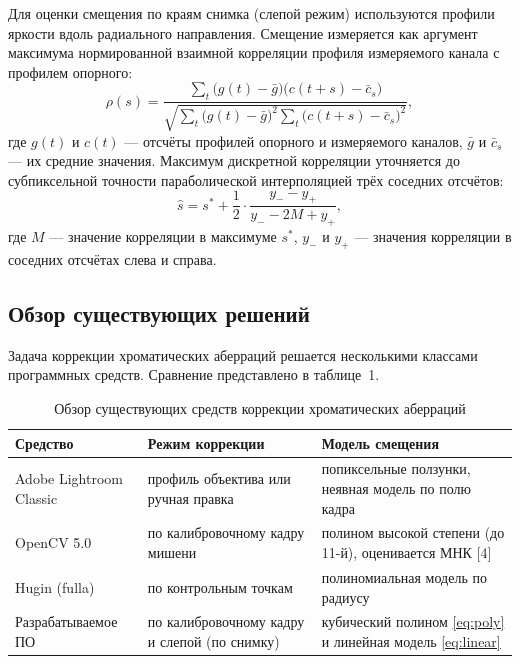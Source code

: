 \documentclass[a4paper,14pt,oneside]{extreport}
\begin{document}
Для оценки смещения по краям снимка (слепой режим) используются профили
яркости вдоль радиального направления. Смещение измеряется как аргумент
максимума нормированной взаимной корреляции профиля измеряемого канала с
профилем опорного:
\begin{equation}
\rho(s) = \frac{\sum_t \bigl(g(t) - \bar{g}\bigr)\bigl(c(t+s) -
\bar{c}_s\bigr)}
{\sqrt{\sum_t \bigl(g(t) - \bar{g}\bigr)^2 \sum_t
\bigl(c(t+s) - \bar{c}_s\bigr)^2}},
\label{eq:ncc}
\end{equation}
где $g(t)$ и $c(t)$ — отсчёты профилей опорного и измеряемого каналов,
$\bar{g}$ и $\bar{c}_s$ — их средние значения. Максимум дискретной
корреляции уточняется до субпиксельной точности параболической
интерполяцией трёх соседних отсчётов:
\begin{equation}
\hat{s} = s^{*} + \frac{1}{2}\cdot\frac{y_{-} - y_{+}}{y_{-} - 2M + y_{+}},
\label{eq:subpixel}
\end{equation}
где $M$ — значение корреляции в максимуме $s^{*}$, $y_{-}$ и $y_{+}$ — значения
корреляции в соседних отсчётах слева и справа.

\subsection{Обзор существующих решений}

Задача коррекции хроматических аберраций решается несколькими классами
программных средств. Сравнение представлено в таблице~1.

\begin{table}[H]
\caption{Обзор существующих средств коррекции хроматических аберраций}
\label{tab:compare}
\small
\begin{tabular}{|p{4.2cm}|p{4.4cm}|p{6.4cm}|}
\hline
Средство & Режим коррекции & Модель смещения \\
\hline
Adobe Lightroom Classic & профиль объектива или ручная правка & попиксельные ползунки, неявная модель по полю кадра \\
\hline
OpenCV 5.0 & по калибровочному кадру мишени & полином высокой степени (до 11-й), оценивается МНК [4] \\
\hline
Hugin (fulla) & по контрольным точкам & полиномиальная модель по радиусу \\
\hline
Разрабатываемое ПО & по калибровочному кадру и слепой (по снимку) & кубический полином \eqref{eq:poly} и линейная модель \eqref{eq:linear} \\
\hline
\end{tabular}
\end{table}
\end{document}
